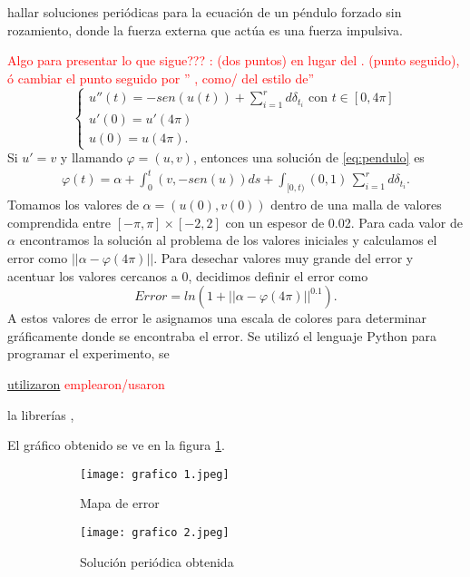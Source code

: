 hallar soluciones periódicas para la ecuación de un péndulo forzado sin rozamiento, donde la fuerza externa que actúa es una fuerza impulsiva.

\textcolor{red}{Algo para presentar lo que sigue???  : (dos puntos) en lugar del . (punto seguido), ó cambiar el punto seguido por  '' , como/ del estilo de''  }
\begin{equation}\label{eq:pendulo}
	\left\lbrace \begin{array}{l}
	u''(t)=-sen(u(t))+\displaystyle\sum_{i=1}^r d \delta_{t_i} \mbox{ con } t\in[0,4\pi]\\
 u'(0)=u'(4\pi)\\
 u(0)=u(4\pi).
	\end{array}\right.
\end{equation} 
Si $u'=v$ y llamando $\varphi=(u,v)$, entonces una solución de \eqref{eq:pendulo} es
 \begin{equation*}
     \begin{split}
        \varphi(t)=\alpha+\int_0^t(v,-sen(u))ds+\int_{[0,t)}(0,1)\, \displaystyle\sum_{i=1}^r d \delta_{t_i}.
     \end{split}
 \end{equation*}
 Tomamos los valores de $\alpha=(u(0),v(0))$ dentro de una malla de valores comprendida entre $[-\pi,\pi]\times[-2,2]$ con un espesor de 0.02. Para cada valor de $\alpha$ encontramos la solución  al problema de los valores iniciales y calculamos el error como $||\alpha-\varphi(4\pi)||$. Para desechar valores muy grande del error y acentuar los valores cercanos a $0$, decidimos definir el error como
 $$Error=ln\left(1+||\alpha-\varphi(4\pi)||^{0.1}\right).$$
 A estos valores de error le asignamos una escala de colores para determinar gráficamente donde se encontraba  el error. Se utilizó el lenguaje Python para programar el experimento, se 
 
 \underline{utilizaron}  \textcolor{red}{emplearon/usaron} 
 
 la librerías \cite{numpy}, \cite{matplot}
 
 
 
  
 El gráfico obtenido se ve en la figura \ref{fig:1}.

 

 \begin{figure}[h]



\begin{subfigure}[h!]{0.45\textwidth}
  \texttt{[image: grafico 1.jpeg]}
  \caption{Mapa de error}
  \label{fig:1}
\end{subfigure}
\hfil
\begin{subfigure}[h!]{0.45\textwidth}
  \texttt{[image: grafico 2.jpeg]}
  \caption{Solución periódica obtenida}
\end{subfigure}	\centering
	\caption{}
\end{figure}




